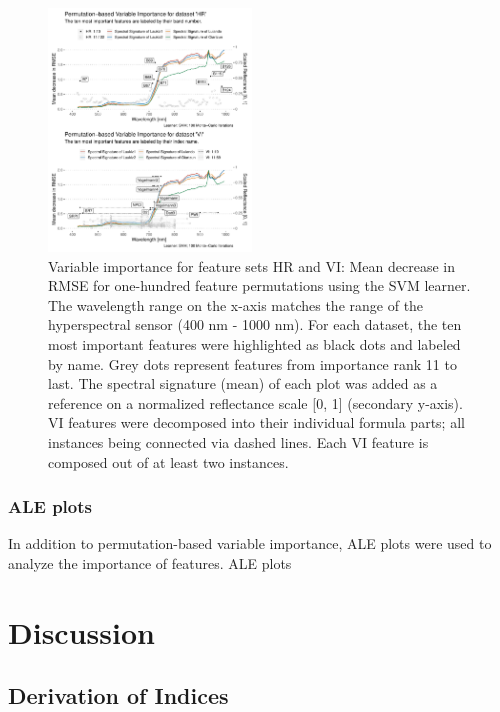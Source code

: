 \documentclass[letterpaper, peerreview]{IEEEtran}
\begin{document}
\begin{figure} [t!]
	\centering
	\begin{center}
		\includegraphics[width=0.48\textwidth] {fi-permut-vi-hr-1.pdf}
		\caption{Variable importance for feature sets HR and VI: Mean decrease in RMSE for one-hundred feature permutations using the SVM learner. The wavelength range on the x-axis matches the range of the hyperspectral sensor (400 nm - 1000 nm). For each dataset, the ten most important features were highlighted as black dots and labeled by name. Grey dots represent features from importance rank 11 to last. The spectral signature (mean) of each plot was added as a reference on a normalized reflectance scale [0, 1] (secondary y-axis). VI features were decomposed into their individual formula parts; all instances being connected via dashed lines. Each VI feature is composed out of at least two instances.}\label{fig:fi-permut-vi-hr}
	\end{center}
\end{figure}

\subsubsection{ALE plots}

In addition to permutation-based variable importance, \ac{ALE} plots were used to analyze the importance of features.
ALE plots

\section{Discussion}

\subsection{Derivation of Indices}
\end{document}
